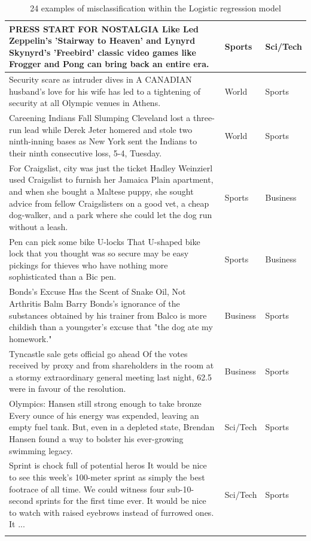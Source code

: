 \documentclass[12pt,a4paper,english]{article}
\begin{document}
\begin{longtable}{| m{25em} | m{5em} | m{5em} |}
PRESS START FOR NOSTALGIA Like Led Zeppelin's 'Stairway to Heaven' and Lynyrd Skynyrd's 'Freebird' classic video games like Frogger and Pong can bring back an entire era. & Sports & Sci/Tech \\ \hline
Security scare as intruder dives in A CANADIAN husband's love for his wife has led to a tightening of security at all Olympic venues in Athens. & World & Sports \\ \hline
Careening Indians Fall Slumping Cleveland lost a three-run lead while Derek Jeter homered and stole two ninth-inning bases as New York sent the Indians to their ninth consecutive loss, 5-4, Tuesday. & World & Sports \\ \hline
For Craigslist, city was just the ticket Hadley Weinzierl used Craigslist to furnish her Jamaica Plain apartment, and when she bought a Maltese puppy, she sought advice from fellow Craigslisters on a good vet, a cheap dog-walker, and a park where she could let the dog run without a leash. & Sports & Business \\ \hline
Pen can pick some bike U-locks That U-shaped bike lock that you thought was so secure may be easy pickings for thieves who have nothing more sophisticated than a Bic pen. & Sports & Business \\ \hline
Bonds's Excuse Has the Scent of Snake Oil, Not Arthritis Balm Barry Bonds's ignorance of the substances obtained by his trainer from Balco is more childish than a youngster's excuse that "the dog ate my homework." & Business & Sports \\ \hline
Tyncastle sale gets official go ahead Of the votes received by proxy and from shareholders in the room at a stormy extraordinary general meeting last night, 62.5 were in favour of the resolution. & Business & Sports \\ \hline
Olympics: Hansen still strong enough to take bronze Every ounce of his energy was expended, leaving an empty fuel tank. But, even in a depleted state, Brendan Hansen found a way to bolster his ever-growing swimming legacy. & Sci/Tech & Sports \\ \hline
Sprint is chock full of potential heros It would be nice to see this week's 100-meter sprint as simply the best footrace of all time. We could witness four sub-10-second sprints for the first time ever. It would be nice to watch with raised eyebrows instead of furrowed ones. It ... & Sci/Tech & Sports \\ \hline

\caption{24 examples of misclassification within the Logistic regression model}
\label{tab:misclassificationLM}

\end{longtable}
\end{document}
